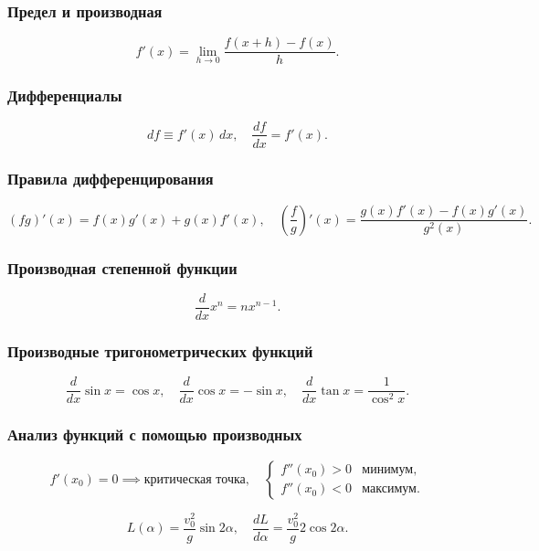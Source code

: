 \documentclass[12pt, a4paper]{article}
\begin{document}
\subsubsection*{Предел и производная}
\[
f'(x)=\lim_{h\to0}\frac{f(x+h)-f(x)}{h}.
\]

\subsubsection*{Дифференциалы}
\[
df \equiv f'(x)\,dx, \quad \frac{df}{dx} = f'(x).
\]

\subsubsection*{Правила дифференцирования}
\[
(fg)'(x) = f(x)g'(x) + g(x)f'(x),
\quad
\left(\frac{f}{g}\right)'(x) = \frac{g(x)f'(x) - f(x)g'(x)}{g^2(x)}.
\]

\subsubsection*{Производная степенной функции}
\[
\frac{d}{dx} x^n = n x^{n-1}.
\]

\subsubsection*{Производные тригонометрических функций}
\[
\frac{d}{dx} \sin x = \cos x, \quad \frac{d}{dx} \cos x = -\sin x, \quad \frac{d}{dx} \tan x = \frac{1}{\cos^2 x}.
\]

\subsubsection*{Анализ функций с помощью производных}
\[
f'(x_0) = 0 \implies \text{критическая точка},
\quad
\begin{cases}
f''(x_0) > 0 & \text{минимум}, \\
f''(x_0) < 0 & \text{максимум}.
\end{cases}
\]

\[
L(\alpha) = \frac{v_0^2}{g} \sin 2\alpha, \quad \frac{dL}{d\alpha} = \frac{v_0^2}{g} 2 \cos 2\alpha.
\]
\end{document}
